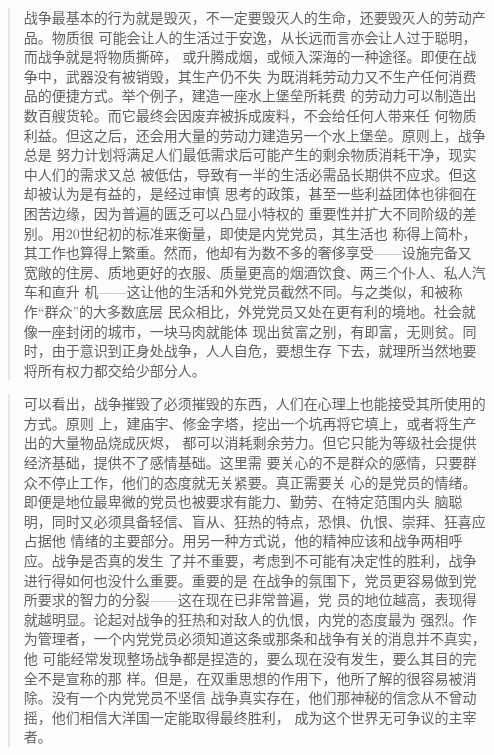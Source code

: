 \begin{quotation}
战争最基本的行为就是毁灭，不一定要毁灭人的生命，还要毁灭人的劳动产品。物质很
可能会让人的生活过于安逸，从长远而言亦会让人过于聪明，而战争就是将物质撕碎，
或升腾成烟，或倾入深海的一种途径。即便在战争中，武器没有被销毁，其生产仍不失
为既消耗劳动力又不生产任何消费品的便捷方式。举个例子，建造一座水上堡垒所耗费
的劳动力可以制造出数百艘货轮。而它最终会因废弃被拆成废料，不会给任何人带来任
何物质利益。但这之后，还会用大量的劳动力建造另一个水上堡垒。原则上，战争总是
努力计划将满足人们最低需求后可能产生的剩余物质消耗干净，现实中人们的需求又总
被低估，导致有一半的生活必需品长期供不应求。但这却被认为是有益的，是经过审慎
思考的政策，甚至一些利益团体也徘徊在困苦边缘，因为普遍的匮乏可以凸显小特权的
重要性并扩大不同阶级的差别。用20世纪初的标准来衡量，即使是内党党员，其生活也
称得上简朴，其工作也算得上繁重。然而，他却有为数不多的奢侈享受——设施完备又
宽敞的住房、质地更好的衣服、质量更高的烟酒饮食、两三个仆人、私人汽车和直升
机——这让他的生活和外党党员截然不同。与之类似，和被称作``群众''的大多数底层
民众相比，外党党员又处在更有利的境地。社会就像一座封闭的城市，一块马肉就能体
现出贫富之别，有即富，无则贫。同时，由于意识到正身处战争，人人自危，要想生存
下去，就理所当然地要将所有权力都交给少部分人。
\end{quotation}

\begin{quotation}
可以看出，战争摧毁了必须摧毁的东西，人们在心理上也能接受其所使用的方式。原则
上，建庙宇、修金字塔，挖出一个坑再将它填上，或者将生产出的大量物品烧成灰烬，
都可以消耗剩余劳力。但它只能为等级社会提供经济基础，提供不了感情基础。这里需
要关心的不是群众的感情，只要群众不停止工作，他们的态度就无关紧要。真正需要关
心的是党员的情绪。即便是地位最卑微的党员也被要求有能力、勤劳、在特定范围内头
脑聪明，同时又必须具备轻信、盲从、狂热的特点，恐惧、仇恨、崇拜、狂喜应占据他
情绪的主要部分。用另一种方式说，他的精神应该和战争两相呼应。战争是否真的发生
了并不重要，考虑到不可能有决定性的胜利，战争进行得如何也没什么重要。重要的是
在战争的氛围下，党员更容易做到党所要求的智力的分裂——这在现在已非常普遍，党
员的地位越高，表现得就越明显。论起对战争的狂热和对敌人的仇恨，内党的态度最为
强烈。作为管理者，一个内党党员必须知道这条或那条和战争有关的消息并不真实，他
可能经常发现整场战争都是捏造的，要么现在没有发生，要么其目的完全不是宣称的那
样。但是，在双重思想的作用下，他所了解的很容易被消除。没有一个内党党员不坚信
战争真实存在，他们那神秘的信念从不曾动摇，他们相信大洋国一定能取得最终胜利，
成为这个世界无可争议的主宰者。
\end{quotation}

